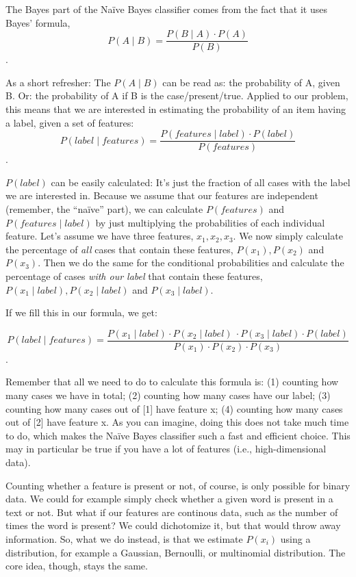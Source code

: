 The Bayes part of the Na\"ive Bayes classifier comes from the fact
that it uses Bayes' formula, $$ P(A \mid B) = \frac{P(B \mid A) \cdot P(A)}{P(B)} $$.

As a short refresher: The $P(A \mid B)$ can be read as: the
probability of A, given B. Or: the probability of A if B is the
case/present/true.  Applied to our problem, this means that we are
interested in estimating the probability of an item having a label,
given a set of features:
$$ P(label \mid features) = \frac{P(features \mid label) \cdot P(label)}{P(features)} $$.

$P(label)$ can be easily calculated: It's just the fraction of all
cases with the label we are interested in.  Because we assume that our
features are independent (remember, the ``na\"ive'' part), we can
calculate $P(features)$ and $P(features\mid label)$ by just
multiplying the probabilities of each individual feature.  Let's
assume we have three features, $x_1, x_2, x_3$.  We now simply
calculate the percentage of \emph{all} cases that contain these
features, $P(x_1), P(x_2)$ and $P(x_3)$.  Then we do the same for the
conditional probabilities and calculate the percentage of cases
\emph{with our label} that contain these features, $P(x_1\mid label),
P(x_2\mid label)$ and $P(x_3\mid label)$.

If we fill this in our formula, we get:


$$ P(label \mid features) = \frac{P(x_1 \mid label) \cdot P(x_2 \mid label)\ \cdot P(x_3 \mid label) \cdot P(label)}{P(x_1) \cdot P(x_2) \cdot P(x_3)}$$.

Remember that all we need to do to calculate this formula is: (1)
counting how many cases we have in total; (2) counting how many cases
have our label; (3) counting how many cases out of [1] have feature x;
(4) counting how many cases out of [2] have feature x.  As you can
imagine, doing this does not take much time to do, which makes the
Na\"ive Bayes classifier such a fast and efficient choice.  This may
in particular be true if you have a lot of features (i.e.,
high-dimensional data).

Counting whether a feature is present or not, of course, is only
possible for binary data. We could for example simply check whether a
given word is present in a text or not.  But what if our features are
continous data, such as the number of times the word is present?  We
could dichotomize it, but that would throw away information.  So, what
we do instead, is that we estimate $P(x_i)$ using a distribution, for
example a Gaussian, Bernoulli, or multinomial distribution. The core
idea, though, stays the same.


